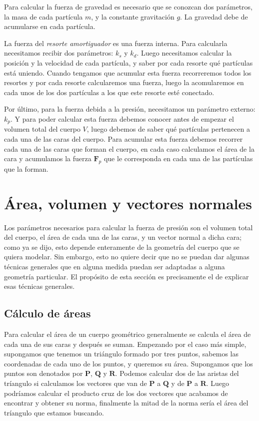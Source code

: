 Para calcular la fuerza de gravedad es necesario que se conozcan dos parámetros, la masa de cada partícula $m$, y la constante gravitación $g$.
La gravedad debe de acumularse en cada partícula.

La fuerza del \emph{resorte amortiguador} es una fuerza interna.
Para calcularla  necesitamos recibir dos parámetros: $k_s$ y $k_d$.
Luego necesitamos calcular la posición y la velocidad de cada partícula, y saber por cada resorte qué partículas está uniendo.
Cuando tengamos que acumular esta fuerza recorreremos todos los resortes y por cada resorte calcularemos una fuerza, luego la acomularemos en cada unos de los dos partículas a los que este resorte esté conectado.

Por último, para la fuerza debida a la presión, necesitamos un parámetro externo: $k_p$.
Y para poder calcular esta fuerza debemos conocer antes de empezar el volumen total del cuerpo $V$, luego debemos de saber qué partículas pertenecen a cada una de las caras del cuerpo.
Para acumular esta fuerza debemos recorrer cada una de las caras que forman el cuerpo, en cada caso calculamos el área de la cara y acumulamos la fuerza $\textbf{F}_p$ que le corresponda en cada una de las partículas que la forman.

\section{Área, volumen y vectores normales}
Los parámetros necesarios para calcular la fuerza de presión son el volumen total del cuerpo, el área de cada una de las caras, y un vector normal a dicha cara; como ya se dijo, esto depende enteramente de la geometría del cuerpo que se quiera modelar.
Sin embargo, esto no quiere decir que no se puedan dar algunas técnicas generales que en alguna medida puedan ser adaptadas a alguna geometría particular.
El propósito de esta sección es precisamente el de explicar esas técnicas generales.

\subsection{Cálculo de áreas}
Para calcular el área de un cuerpo geométrico generalmente se calcula el área de cada una de sus caras y después se suman.
Empezando por el caso más simple, supongamos que tenemos un triángulo formado por tres puntos, sabemos las coordenadas de cada uno de los puntos, y queremos su área.
Supongamos que los puntos son denotados por $\textbf{P}$, $\textbf{Q}$ y $\textbf{R}$.
Podemos calcular dos de las aristas del tríangulo si calculamos los vectores que van de $\textbf{P}$ a $\textbf{Q}$ y de $\textbf{P}$ a $\textbf{R}$.
Luego podríamos calcular el producto cruz de los dos vectores que acabamos de encontrar y obtener su norma, finalmente la mitad de la norma sería el área del tríangulo que estamos buscando.

